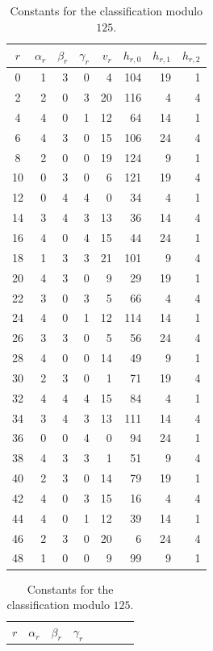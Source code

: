 \documentclass[11pt]{article}
\theoremstyle{plain}
\theoremstyle{definition}
\theoremstyle{remark}
\numberwithin{equation}{section}
\begin{document}
\begin{table}[H]
\centering
\caption{Constants for the classification modulo \(125\).}
\label{tab:p5-mod125-constants}
\small
\setlength{\tabcolsep}{3pt}
\begin{tabular}{@{}c|rrrrrrr@{}}
\toprule
\(r\) & \(\alpha_r\) & \(\beta_r\) & \(\gamma_r\)
& \(v_r\) & \(h_{r,0}\) & \(h_{r,1}\) & \(h_{r,2}\)\\
\midrule
0  & 1 & 3 & 0 & 4  & 104 & 19 & 1\\
2  & 2 & 0 & 3 & 20 & 116 & 4  & 4\\
4  & 4 & 0 & 1 & 12 & 64  & 14 & 1\\
6  & 4 & 3 & 0 & 15 & 106 & 24 & 4\\
8  & 2 & 0 & 0 & 19 & 124 & 9  & 1\\
10 & 0 & 3 & 0 & 6  & 121 & 19 & 4\\
12 & 0 & 4 & 4 & 0  & 34  & 4  & 1\\
14 & 3 & 4 & 3 & 13 & 36  & 14 & 4\\
16 & 4 & 0 & 4 & 15 & 44  & 24 & 1\\
18 & 1 & 3 & 3 & 21 & 101 & 9  & 4\\
20 & 4 & 3 & 0 & 9  & 29  & 19 & 1\\
22 & 3 & 0 & 3 & 5  & 66  & 4  & 4\\
24 & 4 & 0 & 1 & 12 & 114 & 14 & 1\\
26 & 3 & 3 & 0 & 5  & 56  & 24 & 4\\
28 & 4 & 0 & 0 & 14 & 49  & 9  & 1\\
30 & 2 & 3 & 0 & 1  & 71  & 19 & 4\\
32 & 4 & 4 & 4 & 15 & 84  & 4  & 1\\
34 & 3 & 4 & 3 & 13 & 111 & 14 & 4\\
36 & 0 & 0 & 4 & 0  & 94  & 24 & 1\\
38 & 4 & 3 & 3 & 1  & 51  & 9  & 4\\
40 & 2 & 3 & 0 & 14 & 79  & 19 & 1\\
42 & 4 & 0 & 3 & 15 & 16  & 4  & 4\\
44 & 4 & 0 & 1 & 12 & 39  & 14 & 1\\
46 & 2 & 3 & 0 & 20 & 6   & 24 & 4\\
48 & 1 & 0 & 0 & 9  & 99  & 9  & 1\\
\bottomrule
\end{tabular}
\hspace{1.5em}
\begin{tabular}{@{}c|rrrrrrr@{}}
\toprule
\(r\) & \(\alpha_r\) & \(\beta_r\) & \(\gamma_r\)

\end{tabular}
\end{table}
\end{document}

